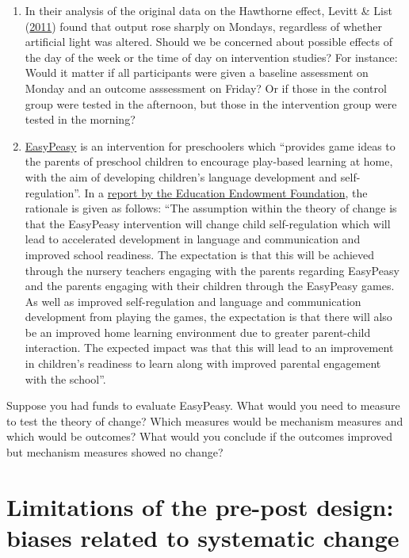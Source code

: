 \documentclass{krantz}
\begin{document}
\begin{enumerate}
\def\labelenumi{\arabic{enumi}.}
\item
  In their analysis of the original data on the Hawthorne effect, Levitt \& List (\protect\hyperlink{ref-levitt2011}{2011}) found that output rose sharply on Mondays, regardless of whether artificial light was altered. Should we be concerned about possible effects of the day of the week or the time of day on intervention studies? For instance: Would it matter if all participants were given a baseline assessment on Monday and an outcome asssessment on Friday? Or if those in the control group were tested in the afternoon, but those in the intervention group were tested in the morning?
\item
  \href{https://guidebook.eif.org.uk/programme/easypeasy}{EasyPeasy} is an intervention for preschoolers which ``provides game ideas to the parents of preschool children to encourage play-based learning at home, with the aim of developing children's language development and self-regulation''. In a \href{https://d2tic4wvo1iusb.cloudfront.net/documents/projects/EasyPeasy.pdf?v=1686132397}{report by the Education Endowment Foundation}, the rationale is given as follows: ``The assumption within the theory of change is that the EasyPeasy intervention will change child self-regulation which will lead to accelerated development in language and communication and improved school readiness. The expectation is that this will be achieved through the nursery teachers engaging with the parents regarding EasyPeasy and the parents engaging with their children through the EasyPeasy games. As well as improved self-regulation and language and communication development from playing the games, the expectation is that there will also be an improved home learning environment due to greater parent-child interaction. The expected impact was that this will lead to an improvement in children's readiness to learn along with improved parental engagement with the school''.
\end{enumerate}

Suppose you had funds to evaluate EasyPeasy. What would you need to measure to test the theory of change? Which measures would be mechanism measures and which would be outcomes? What would you conclude if the outcomes improved but mechanism measures showed no change?

\hypertarget{prepost}{%
\chapter{Limitations of the pre-post design: biases related to systematic change}\label{prepost}}
\end{document}

